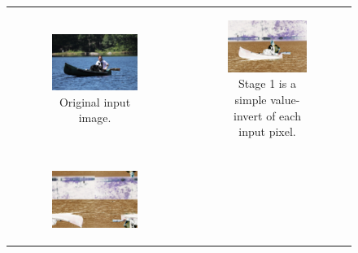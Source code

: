 \documentclass{article}
\begin{document}
\begin{figure}[t]
	\begin{tabular}{cc}
	\begin{subfigure}[b]{0.45\textwidth}
		\begin{center}
		\includegraphics[width=0.85\textwidth]{canoe-0.png}
		\end{center}
		\caption{Original input image.}
	\end{subfigure} &
	\begin{subfigure}[b]{0.45\textwidth}
		\begin{center}
		\includegraphics[width=0.85\textwidth]{canoe-1.png}
		\end{center}
		\caption{Stage 1 is a simple value-invert of each input pixel.}
		\label{fig:invert}
	\end{subfigure} \\
	& \\
	\begin{subfigure}[b]{0.45\textwidth}
		\begin{center}
		\includegraphics[width=0.85\textwidth]{canoe-2.png}

\end{center}
\end{subfigure}
\end{tabular}
\end{figure}
\end{document}
